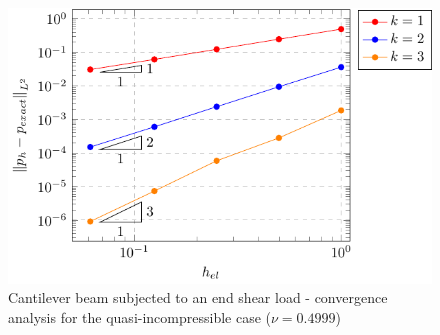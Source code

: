 \documentclass{wccm2024}
\begin{document}
\begin{figure}
     \hfill
    \includegraphics[trim={8.5cm 0cm 0cm 0cm},clip,scale=0.75]{figs/bishop-pres-04999.pdf}
    \caption{Cantilever beam subjected to an end shear load - convergence analysis for the quasi-incompressible case ($\nu=0.4999$)}
    \label{fig:bishop-convergence-nu-04999}
\end{figure}
\end{document}
